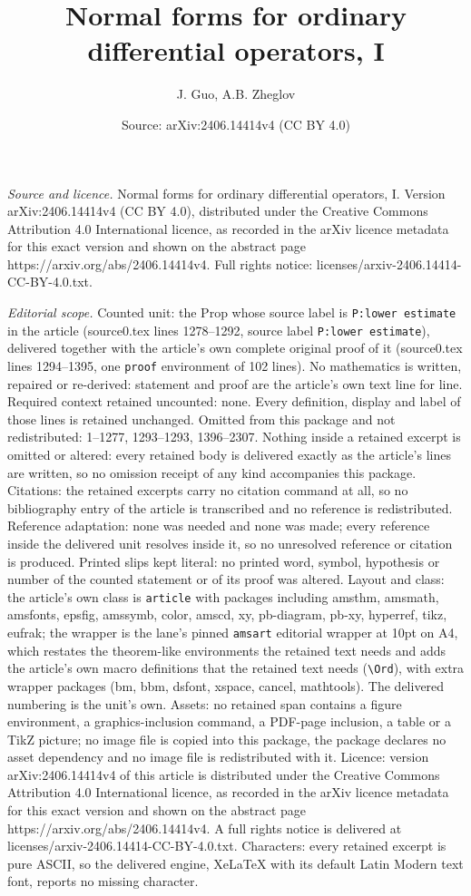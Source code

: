 \documentclass[10pt,a4paper]{amsart}
\title[Normal forms for ordinary differential operators, I]{Normal forms for ordinary differential operators, I}
\author{J. Guo, A.B. Zheglov}
\date{Source: arXiv:2406.14414v4 (CC BY 4.0)}
\begin{document}
\maketitle

\noindent\emph{Source and licence.} Normal forms for ordinary differential operators, I. Version arXiv:2406.14414v4 (CC BY 4.0), distributed under the Creative Commons Attribution 4.0 International licence, as recorded in the arXiv licence metadata for this exact version and shown on the abstract page https://arxiv.org/abs/2406.14414v4. Full rights notice: licenses/arxiv-2406.14414-CC-BY-4.0.txt.\par\smallskip

\noindent\textit{Editorial scope.} Counted unit: the Prop whose source label is \texttt{P:lower estimate} in the article (source0.tex lines 1278--1292, source label \texttt{P:lower estimate}), delivered together with the article's own complete original proof of it (source0.tex lines 1294--1395, one \texttt{proof} environment of 102 lines). No mathematics is written, repaired or re-derived: statement and proof are the article's own text line for line. Required context retained uncounted: none. Every definition, display and label of those lines is retained unchanged. Omitted from this package and not redistributed: 1--1277, 1293--1293, 1396--2307. Nothing inside a retained excerpt is omitted or altered: every retained body is delivered exactly as the article's lines are written, so no omission receipt of any kind accompanies this package. Citations: the retained excerpts carry no citation command at all, so no bibliography entry of the article is transcribed and no reference is redistributed. Reference adaptation: none was needed and none was made; every reference inside the delivered unit resolves inside it, so no unresolved reference or citation is produced. Printed slips kept literal: no printed word, symbol, hypothesis or number of the counted statement or of its proof was altered. Layout and class: the article's own class is \texttt{article} with packages including amsthm, amsmath, amsfonts, epsfig, amssymb, color, amscd, xy, pb-diagram, pb-xy, hyperref, tikz, eufrak; the wrapper is the lane's pinned \texttt{amsart} editorial wrapper at 10pt on A4, which restates the theorem-like environments the retained text needs and adds the article's own macro definitions that the retained text needs (\texttt{\textbackslash Ord}), with extra wrapper packages (bm, bbm, dsfont, xspace, cancel, mathtools). The delivered numbering is the unit's own. Assets: no retained span contains a figure environment, a graphics-inclusion command, a PDF-page inclusion, a table or a TikZ picture; no image file is copied into this package, the package declares no asset dependency and no image file is redistributed with it. Licence: version arXiv:2406.14414v4 of this article is distributed under the Creative Commons Attribution 4.0 International licence, as recorded in the arXiv licence metadata for this exact version and shown on the abstract page https://arxiv.org/abs/2406.14414v4. A full rights notice is delivered at licenses/arxiv-2406.14414-CC-BY-4.0.txt. Characters: every retained excerpt is pure ASCII, so the delivered engine, XeLaTeX with its default Latin Modern text font, reports no missing character.
\end{document}
